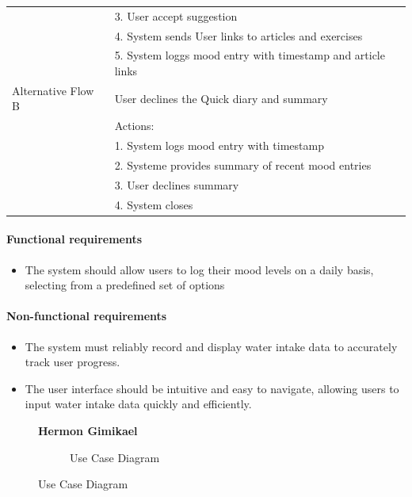\documentclass{article}
\begin{document}
\begin{table}[h!]
\begin{tabularx}{\textwidth}{|>{\raggedright\arraybackslash}p{}|X|}
                         & 3. User accept suggestion \\
                         & 4. System sends User links to articles and exercises \\
                         & 5. System loggs mood entry with timestamp and article links \\ \hline
        Alternative Flow B & User declines the Quick diary and summary  \\
                         & Actions: \\
                         & 1. System logs mood entry with timestamp \\
                         & 2. Systeme provides summary of recent mood entries\\
                         & 3. User declines summary \\
                         & 4. System closes \\ \hline
    \end{tabularx}
\end{table}

\paragraph{Functional requirements}
		\begin{itemize}
			\item  The system should allow users to log their mood levels on a daily basis, selecting from a predefined set of options
		\end{itemize}
		
	\paragraph{Non-functional requirements}
		\begin{itemize}
			\item The system must reliably record and display water intake data to accurately track user progress.
			\item The user interface should be intuitive and easy to navigate, allowing users to input water intake data quickly and efficiently.
		\end{itemize}

\clearpage

\begin{figure}[htbp]
    \textbf{Hermon Gimikael}
    \centering
    \begin{subfigure}{\textwidth}
        \resizebox{\textwidth}{!}{}
        \caption{Use Case Diagram}
    \end{subfigure}
\end{figure}
\end{document}
